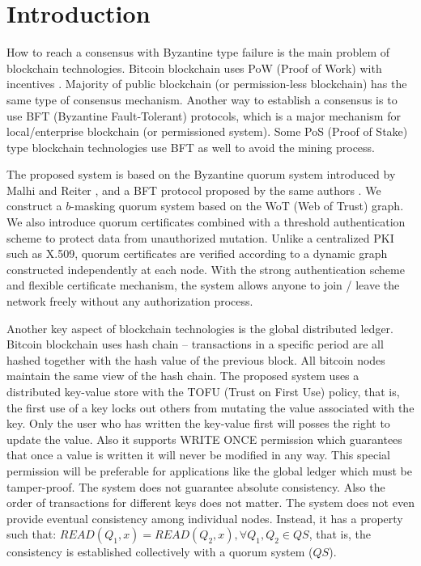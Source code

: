 \section{Introduction}
How to reach a consensus with Byzantine type failure is the main
problem of blockchain technologies. Bitcoin blockchain uses PoW (Proof
of Work) with incentives \cite{bitcoin}. Majority of public blockchain
(or permission-less blockchain) has the same type of consensus
mechanism. Another way to establish a consensus is to use BFT
(Byzantine Fault-Tolerant) protocols, which is a major mechanism for
local/enterprise blockchain (or permissioned system). Some PoS (Proof
of Stake) type blockchain technologies use BFT as well to avoid the
mining process.

The proposed system is based on the Byzantine quorum system introduced
by Malhi and Reiter \cite{Delhi:1}, and a BFT protocol proposed by the
same authors \cite{Delhi:2}. We construct a $b$-masking quorum system
based on the WoT (Web of Trust) graph. We also introduce quorum
certificates combined with a threshold authentication scheme to
protect data from unauthorized mutation. Unlike a centralized PKI such
as X.509, quorum certificates are verified according to a dynamic
graph constructed independently at each node. With the strong
authentication scheme and flexible certificate mechanism, the system
allows anyone to join / leave the network freely without any
authorization process.

Another key aspect of blockchain technologies is the global
distributed ledger. Bitcoin blockchain uses hash chain -- transactions
in a specific period are all hashed together with the hash value of
the previous block. All bitcoin nodes maintain the same view of the
hash chain.
The proposed system uses a distributed key-value store with the TOFU
(Trust on First Use) policy, that is, the first use of a key locks out
others from mutating the value associated with the key. Only the
user who has written the key-value first will posses the right to
update the value. Also it supports WRITE ONCE permission which
guarantees that once a value is written it will never be modified in
any way. This special permission will be preferable for applications
like the global ledger which must be tamper-proof.
The system does not guarantee absolute consistency. Also the order of
transactions for different keys does not matter. The system does not
even provide eventual consistency among individual nodes. Instead, it
has a property such that: $READ(Q_1, x) = READ(Q_2, x), \forall Q_1,
Q_2 \in QS$, that is, the consistency is established collectively with
a quorum system ($QS$).

